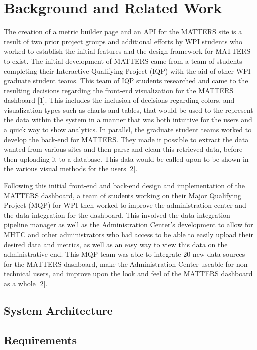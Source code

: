 \chapter{Background and Related Work}

The creation of a metric builder page and an API for the MATTERS site is a result of two prior project groups and additional efforts by WPI students who worked to establish the initial features and the design framework for MATTERS to exist. The initial development of MATTERS came from a team of students completing their Interactive Qualifying Project (IQP) with the aid of other WPI graduate student teams. This team of IQP students researched and came to the resulting decisions regarding the front-end visualization for the MATTERS dashboard [1]. This includes the inclusion of decisions regarding colors, and visualization types such as charts and tables, that would be used to the represent the data within the system in a manner that was both intuitive for the users and a quick way to show analytics. In parallel, the graduate student teams worked to develop the back-end for MATTERS. They made it possible to extract the data wanted from various sites and then parse and clean this retrieved data, before then uploading it to a database. This data would be called upon to be shown in the various visual methods for the users [2].

Following this initial front-end and back-end design and implementation of the MATTERS dashboard, a team of students working on their Major Qualifying Project (MQP) for WPI then worked to improve the administration center and the data integration for the dashboard. This involved the data integration pipeline manager as well as the Administration Center’s development to allow for MHTC and other administrators who had access to be able to easily upload their desired data and metrics, as well as an easy way to view this data on the administrative end. This MQP team was able to integrate 20 new data sources for the MATTERS dashboard, make the Administration Center useable for non-technical users, and improve upon the look and feel of the MATTERS dashboard as a whole [2].

\section{System Architecture}

\section{Requirements}

